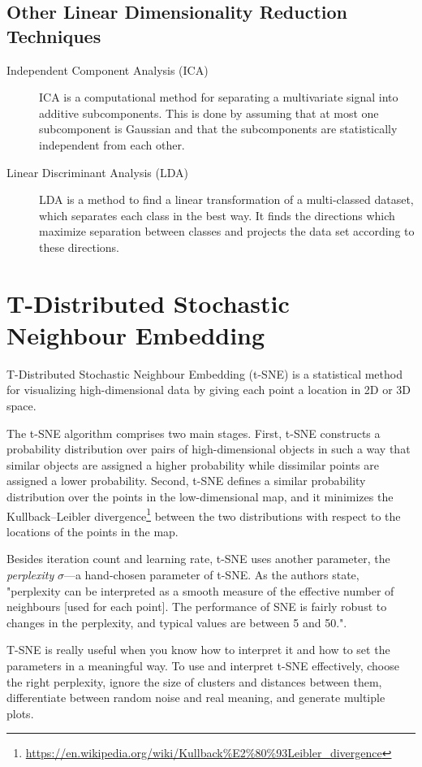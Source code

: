 \subsection{Other Linear Dimensionality Reduction Techniques}
\begin{description}
    \item[Independent Component Analysis (ICA)] ICA is a computational method for separating a multivariate signal into additive subcomponents. This is done by assuming that at most one subcomponent is Gaussian and that the subcomponents are statistically independent from each other.

    \item[Linear Discriminant Analysis (LDA)] LDA is a method to find a linear transformation of a multi-classed dataset, which separates each class in the best way.
        It finds the directions which maximize separation between classes and projects the data set according to these directions.
\end{description}

\section{T-Distributed Stochastic Neighbour Embedding}
T-Distributed Stochastic Neighbour Embedding (t-SNE) is a statistical method for visualizing high-dimensional data by giving each point a location in 2D or 3D space.

The t-SNE algorithm comprises two main stages.
First, t-SNE constructs a probability distribution over pairs of high-dimensional objects in such a way that similar objects are assigned a higher probability while dissimilar points are assigned a lower probability.
Second, t-SNE defines a similar probability distribution over the points in the low-dimensional map, and it minimizes the Kullback–Leibler divergence\footnote{\url{https://en.wikipedia.org/wiki/Kullback\%E2\%80\%93Leibler_divergence}} between the two distributions with respect to the locations of the points in the map.

Besides iteration count and learning rate, t-SNE uses another parameter, the \emph{perplexity} \(\sigma\)---a hand-chosen parameter of t-SNE.
As the authors state, "perplexity can be interpreted as a smooth measure of the effective number of neighbours [used for each point].
The performance of SNE is fairly robust to changes in the perplexity, and typical values are between 5 and 50.".

T-SNE is really useful when you know how to interpret it and how to set the parameters in a meaningful way.
To use and interpret t-SNE effectively, choose the right perplexity, ignore the size of clusters and distances between them, differentiate between random noise and real meaning, and generate multiple plots.

